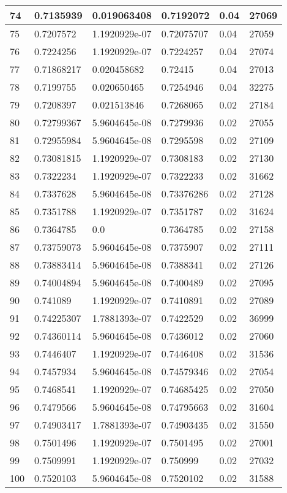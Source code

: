 \begin{longtable}{|l|l|l|l|l|l|}
74 & 0.7135939 & 0.019063408 & 0.7192072 & 0.04 & 27069 \\ \hline 
75 & 0.7207572 & 1.1920929e-07 & 0.72075707 & 0.04 & 27059 \\ \hline 
76 & 0.7224256 & 1.1920929e-07 & 0.7224257 & 0.04 & 27074 \\ \hline 
77 & 0.71868217 & 0.020458682 & 0.72415 & 0.04 & 27013 \\ \hline 
78 & 0.7199755 & 0.020650465 & 0.7254946 & 0.04 & 32275 \\ \hline 
79 & 0.7208397 & 0.021513846 & 0.7268065 & 0.02 & 27184 \\ \hline 
80 & 0.72799367 & 5.9604645e-08 & 0.7279936 & 0.02 & 27055 \\ \hline 
81 & 0.72955984 & 5.9604645e-08 & 0.7295598 & 0.02 & 27109 \\ \hline 
82 & 0.73081815 & 1.1920929e-07 & 0.7308183 & 0.02 & 27130 \\ \hline 
83 & 0.7322234 & 1.1920929e-07 & 0.7322233 & 0.02 & 31662 \\ \hline 
84 & 0.7337628 & 5.9604645e-08 & 0.73376286 & 0.02 & 27128 \\ \hline 
85 & 0.7351788 & 1.1920929e-07 & 0.7351787 & 0.02 & 31624 \\ \hline 
86 & 0.7364785 & 0.0 & 0.7364785 & 0.02 & 27158 \\ \hline 
87 & 0.73759073 & 5.9604645e-08 & 0.7375907 & 0.02 & 27111 \\ \hline 
88 & 0.73883414 & 5.9604645e-08 & 0.7388341 & 0.02 & 27126 \\ \hline 
89 & 0.74004894 & 5.9604645e-08 & 0.7400489 & 0.02 & 27095 \\ \hline 
90 & 0.741089 & 1.1920929e-07 & 0.7410891 & 0.02 & 27089 \\ \hline 
91 & 0.74225307 & 1.7881393e-07 & 0.7422529 & 0.02 & 36999 \\ \hline 
92 & 0.74360114 & 5.9604645e-08 & 0.7436012 & 0.02 & 27060 \\ \hline 
93 & 0.7446407 & 1.1920929e-07 & 0.7446408 & 0.02 & 31536 \\ \hline 
94 & 0.7457934 & 5.9604645e-08 & 0.74579346 & 0.02 & 27054 \\ \hline 
95 & 0.7468541 & 1.1920929e-07 & 0.74685425 & 0.02 & 27050 \\ \hline 
96 & 0.7479566 & 5.9604645e-08 & 0.74795663 & 0.02 & 31604 \\ \hline 
97 & 0.74903417 & 1.7881393e-07 & 0.74903435 & 0.02 & 31550 \\ \hline 
98 & 0.7501496 & 1.1920929e-07 & 0.7501495 & 0.02 & 27001 \\ \hline 
99 & 0.7509991 & 1.1920929e-07 & 0.750999 & 0.02 & 27032 \\ \hline 
100 & 0.7520103 & 5.9604645e-08 & 0.7520102 & 0.02 & 31588 \\ \hline 
\end{longtable}